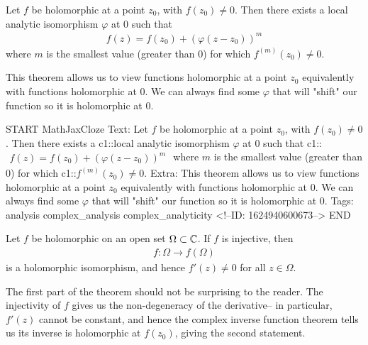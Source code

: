\documentclass{memoir}
\begin{document}
\begin{thm}
	Let \(f\) be holomorphic at a point \(z_0\), with \(f(z_0)\neq 0\). Then there exists a local analytic isomorphism \(\varphi \) at 0 such that
	\begin{align*}
		f(z) = f(z_0) + (\varphi (z-z_0))^{m}
	\end{align*}
	where \(m\) is the smallest value (greater than \(0\)) for which \(f^{(m)}(z_0)\neq 0\).
\end{thm}

This theorem allows us to view functions holomorphic at a point \(z_0\) equivalently with functions holomorphic at \(0\). We can always find some \(\varphi \) that will "shift" our function so it is holomorphic at \(0\).

\begin{anki}
START
MathJaxCloze
Text: Let \(f\) be holomorphic at a point \(z_0\), with \(f(z_0)\neq 0\). Then there exists a {{c1::local analytic isomorphism}} \(\varphi \) at 0 such that
{{c1::\(\begin{align*}
         	f(z) = f(z_0) + (\varphi (z-z_0))^{m}
         \end{align*}\)}}
where \(m\) is the smallest value (greater than \(0\)) for which {{c1::\(f^{(m)}(z_0)\neq 0\)}}.
Extra: This theorem allows us to view functions holomorphic at a point \(z_0\) equivalently with functions holomorphic at \(0\). We can always find some \(\varphi \) that will "shift" our function so it is holomorphic at \(0\).
Tags: analysis complex_analysis complex_analyticity
<!--ID: 1624940600673-->
END
\end{anki}


\begin{thm}
	Let \(f\) be holomorphic on an open set \(\Omega \subset \mathbb{C}\). If \(f\) is injective, then
	\begin{align*}
		f:\Omega \to f(\Omega )
	\end{align*}
	is a holomorphic isomorphism, and hence \(f'(z)\neq 0\) for all \(z \in \Omega \).
\end{thm}
The first part of the theorem should not be surprising to the reader. The injectivity of \(f\) gives us the non-degeneracy of the derivative-- in particular, \(f'(z)\) cannot be constant, and hence the complex inverse function theorem tells us its inverse is holomorphic at \(f(z_0)\), giving the second statement.
\end{document}
